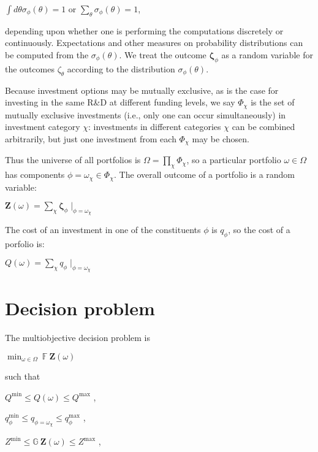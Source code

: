 \documentclass[letterpaper,10pt,english]{sphinxmanual}
\begin{document}
\sphinxAtStartPar
\(\int d\theta \sigma_\phi(\theta) = 1\) or
\(\sum_\theta \sigma_\phi(\theta) = 1\),

\sphinxAtStartPar
depending upon whether one is performing the computations discretely or
continuously. Expectations and other measures on probability
distributions can be computed from the \(\sigma_\phi(\theta)\). We
treat the outcome \(\mathbf{\zeta}_\phi\) as a random variable for
the outcomes \(\zeta_\theta\) according to the distribution
\(\sigma_\phi(\theta)\).

\sphinxAtStartPar
Because investment options may be mutually exclusive, as is the case for
investing in the same R\&D at different funding levels, we say
\(\Phi_\chi\) is the set of mutually exclusive investments (i.e.,
only one can occur simultaneously) in investment category \(\chi\):
investments in different categories \(\chi\) can be combined
arbitrarily, but just one investment from each \(\Phi_\chi\) may be
chosen.

\sphinxAtStartPar
Thus the universe of all portfolios is
\(\Omega = \prod_\chi \Phi_\chi\), so a particular portfolio
\(\omega \in \Omega\) has components
\(\phi = \omega_\chi \in \Phi_\chi\). The overall outcome of a
portfolio is a random variable:

\sphinxAtStartPar
\(\mathbf{Z}(\omega) = \sum_\chi \mathbf{\zeta}_\phi \mid_{\phi = \omega_\chi}\)

\sphinxAtStartPar
The cost of an investment in one of the constituents \(\phi\) is
\(q_\phi\), so the cost of a porfolio is:

\sphinxAtStartPar
\(Q(\omega) = \sum_\chi q_\phi \mid_{\phi = \omega_\chi}\)


\section{Decision problem}
\label{\detokenize{formulation:decision-problem}}
\sphinxAtStartPar
The multi\sphinxhyphen{}objective decision problem is

\sphinxAtStartPar
\(\min_{\omega \in \Omega} \  \mathbb{F} \  \mathbf{Z}(\omega)\)

\sphinxAtStartPar
such that

\sphinxAtStartPar
\(Q^\mathrm{min} \leq Q(\omega) \leq Q^\mathrm{max}\) ,

\sphinxAtStartPar
\(q^\mathrm{min}_\phi \leq q_{\phi=\omega_\chi} \leq q^\mathrm{max}_\phi\)
,

\sphinxAtStartPar
\(Z^\mathrm{min} \leq \mathbb{G} \  \mathbf{Z}(\omega) \leq Z^\mathrm{max}\)
,
\end{document}
